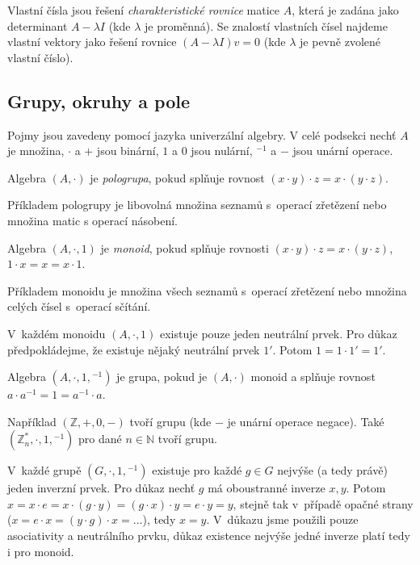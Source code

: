 Vlastní čísla jsou řešení {\em charakteristické rovnice} matice $A$,
která je zadána jako determinant $A - \lambda I$ (kde $\lambda$ je
proměnná).
Se znalostí vlastních čísel najdeme vlastní vektory jako řešení rovnice
$(A - \lambda I) v = 0$ (kde $\lambda$ je pevně zvolené vlastní číslo).

\subsection{Grupy, okruhy a pole}

Pojmy jsou zavedeny pomocí jazyka univerzální algebry. V celé podsekci
nechť $A$ je množina, $\cdot$ a $+$ jsou binární, $1$ a $0$ jsou
nulární, ${^{-1}}$ a $-$ jsou unární operace.

\begin{definition}[Pologrupa]
    Algebra $(A, \cdot)$ je {\em pologrupa},
    pokud splňuje rovnost
    $(x \cdot y) \cdot z = x \cdot (y \cdot z)$.
\end{definition}

Příkladem pologrupy je libovolná množina seznamů s~operací zřetězení
nebo množina matic s operací násobení.

\begin{definition}[Monoid]
    Algebra $(A, \cdot, 1)$ je {\em monoid}, pokud
    splňuje rovnosti
    $(x \cdot y) \cdot z = x \cdot (y \cdot z)$,
    $1 \cdot x = x = x \cdot 1$.
\end{definition}

Příkladem monoidu je množina všech seznamů s~operací zřetězení nebo
množina celých čísel s~operací sčítání.

V~každém monoidu $(A, \cdot, 1)$ existuje pouze jeden neutrální
prvek. Pro důkaz předpokládejme, že existuje nějaký neutrální prvek $1'$.
Potom $1 = 1 \cdot 1' = 1'$.

\begin{definition}[Grupa]
    Algebra $(A, \cdot, 1, {^{-1}})$ je grupa, pokud
    je $(A, \cdot)$ monoid a splňuje rovnost $a \cdot a^{-1} = 1 = a^{-1} \cdot a$.
\end{definition}

Například $(\mathbb{Z}, +, 0, -)$ tvoří grupu (kde $-$ je unární operace negace).
Také $(\mathbb{Z}^*_n, \cdot, 1, {^{-1}})$ pro dané $n \in \mathbb{N}$ tvoří grupu.

V~každé grupě $(G, \cdot, 1, {^{-1}})$ existuje pro každé $g \in G$ nejvýše
(a tedy právě) jeden inverzní prvek.
Pro důkaz nechť $g$ má oboustranné inverze $x,y$.
Potom $x = x \cdot e = x \cdot (g \cdot y) = (g \cdot x) \cdot y
= e \cdot y = y$, stejně tak v~případě opačné strany
($x = e \cdot x = (y \cdot g) \cdot x =\ldots$),
tedy $x = y$. V~důkazu jsme použili pouze asociativity a neutrálního
prvku, důkaz existence nejvýše jedné inverze platí tedy i pro monoid.


